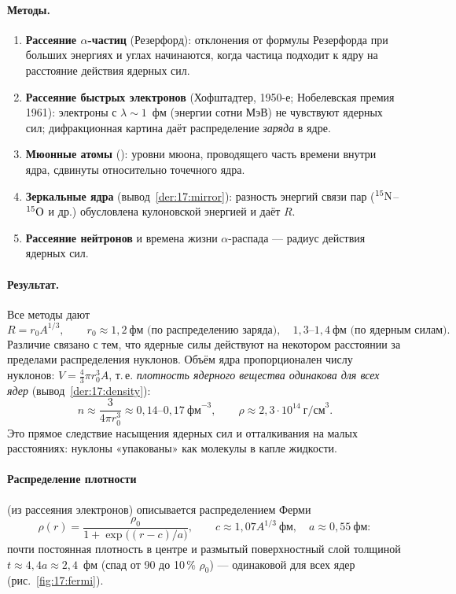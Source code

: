 \paragraph{Методы.}
\begin{enumerate}
 \item \textbf{Рассеяние $\alpha$-частиц} (Резерфорд): отклонения от формулы Резерфорда при больших энергиях и углах
       начинаются, когда частица подходит к ядру на расстояние действия ядерных сил.
 \item \textbf{Рассеяние быстрых электронов} (Хофштадтер, 1950-е; Нобелевская премия 1961): электроны с $\lambda\sim1$~фм
       (энергии сотни МэВ) не чувствуют ядерных сил; дифракционная картина даёт распределение \emph{заряда} в ядре.
 \item \textbf{Мюонные атомы} (): уровни мюона, проводящего часть времени внутри ядра, сдвинуты относительно
       точечного ядра.
 \item \textbf{Зеркальные ядра} (вывод~\ref{der:17:mirror}): разность энергий связи пар ($\nucl{N}{15}$--$\nucl{O}{15}$ и др.) обусловлена
       кулоновской энергией и даёт $R$.
 \item \textbf{Рассеяние нейтронов} и времена жизни $\alpha$-распада — радиус действия ядерных сил.
\end{enumerate}

\paragraph{Результат.} Все методы дают
\begin{equation}\label{eq:17:R}
  R=r_0A^{1/3},\qquad r_0\approx1{,}2\ \text{фм (по распределению заряда)},\quad 1{,}3\text{--}1{,}4\ \text{фм (по ядерным силам)}.
\end{equation}
Различие связано с тем, что ядерные силы действуют на некотором расстоянии за пределами распределения
нуклонов. Объём ядра пропорционален числу нуклонов: $V=\frac43\pi r_0^3A$, т.\,е. \emph{плотность ядерного вещества
одинакова для всех ядер} (вывод~\ref{der:17:density}):
\[
  n\approx\frac{3}{4\pi r_0^3}\approx0{,}14\text{--}0{,}17\ \text{фм}^{-3},\qquad \rho\approx2{,}3\cdot10^{14}\ \text{г/см}^3.
\]
Это прямое следствие насыщения ядерных сил и отталкивания на малых расстояниях: нуклоны «упакованы» как молекулы
в капле жидкости.

\paragraph{Распределение плотности} (из рассеяния электронов) описывается распределением Ферми
\begin{equation}\label{eq:17:fermi}
  \rho(r)=\frac{\rho_0}{1+\exp\bigl((r-c)/a\bigr)},\qquad c\approx1{,}07A^{1/3}\ \text{фм},\quad a\approx0{,}55\ \text{фм}:
\end{equation}
почти постоянная плотность в центре и размытый поверхностный слой толщиной $t\approx4{,}4a\approx2{,}4$~фм (спад
от 90 до 10\,\% $\rho_0$) — одинаковой для всех ядер (рис.~\ref{fig:17:fermi}).


